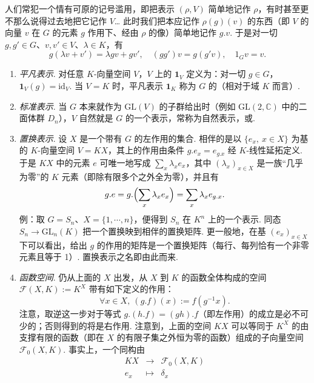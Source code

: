 人们常犯一个情有可原的记号滥用，即把表示 $(\rho,V)$ 简单地记作 $\rho$，有时甚至更不那么说得过去地把它记作 $V$\ldots{} 此时我们把本应记作 $\rho(g)(v)$ 的东西（即 $V$ 的向量 $v$ 在 $G$ 的元素 $g$ 作用下、经由 $\rho$ 的像）简单地记作 $g.v$. 于是对一切 $g,g'\in G$、$v,v'\in V$、$\lambda\in K$，有
\[
g(\lambda v+v')=\lambda gv+gv',\quad (gg')v=g(g'v),\quad 1_Gv=v.
\]
\begin{numpara}[例]\label{np:fg-4-1-2}
\begin{enumerate}[label=\roman*)]
\item \emph{平凡表示}. 对任意 $K$-向量空间 $V$，$V$ 上的 $\mathbf{1}_V$ 定义为：对一切 $g\in G$，$\mathbf{1}_V(g)=\mathrm{id}_V$. 当 $V=K$ 时，平凡表示 $\mathbf{1}_K$ 称为 $G$ 的（相对于域 $K$ 而言）.
\item \emph{标准表示}. 当 $G$ 本来就作为 $\mathrm{GL}(V)$ 的子群给出时（例如 $\mathrm{GL}(2,\mathbb{C})$ 中的二面体群 $D_n$），$V$ 自然就是 $G$ 的一个表示，常称为自然表示，或.
\item \emph{置换表示}. 设 $X$ 是一个带有 $G$ 的左作用的集合. 相伴的是以 $\{e_x,\ x\in X\}$ 为基的 $K$-向量空间 $V=KX$，其上的作用由条件 $g.e_x=e_{g.x}$ 经 $K$-线性延拓定义. 于是 $KX$ 中的元素 $e$ 可唯一地写成 $\sum_x\lambda_x e_x$，其中 $(\lambda_x)_{x\in X}$ 是一族``几乎为零''的 $K$ 元素（即除有限多个之外全为零），并且有
\[
g.e=g.\Bigl(\sum_x\lambda_x e_x\Bigr)=\sum_x\lambda_x e_{g.x}.
\]
例：取 $G=S_n$、$X=\{1,\cdots,n\}$，便得到 $S_n$ 在 $K^n$ 上的一个表示. 同态 $S_n\longrightarrow\mathrm{GL}_n(K)$ 把一个置换映到相伴的置换矩阵. 更一般地，在基 $(e_x)_{x\in X}$ 下可以看出，给出 $g$ 的作用的矩阵是一个置换矩阵（每行、每列恰有一个非零元素且等于 1）. 置换表示之名即由此而来.
\item \emph{函数空间}. 仍从上面的 $X$ 出发，从 $X$ 到 $K$ 的函数全体构成的空间 $\mathcal{F}(X,K):=K^X$ 带有如下定义的作用：
\[
\forall x\in X,\ (g.f)(x):=f(g^{-1}x).
\]
注意，取逆这一步对于等式 $g.(h.f)=(gh).f$（即左作用）的成立是必不可少的；否则得到的将是右作用. 注意到，上面的空间 $KX$ 可以等同于 $K^X$ 的由支撑有限的函数（即在 $X$ 的有限子集之外恒为零的函数）组成的子向量空间 $\mathcal{F}_0(X,K)$. 事实上，一个同构由
\[
\begin{array}{rcl}
KX & \longrightarrow & \mathcal{F}_0(X,K)\\
e_x & \longmapsto & \delta_x

\end{array}\]
\end{enumerate}
\end{numpara}
